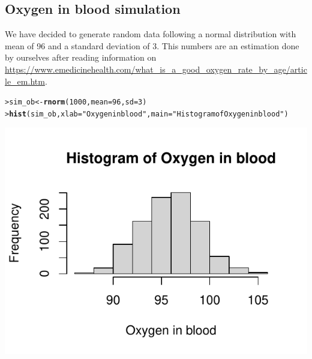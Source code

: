 \documentclass{article}\usepackage[]{graphicx}\usepackage[]{xcolor}
\makeatletter
\def\maxwidth{ %
  \ifdim\Gin@nat@width>\linewidth
    \linewidth
  \else
    \Gin@nat@width
  \fi
}
\newcommand{\hlnum}[1]{\textcolor[rgb]{0.686,0.059,0.569}{#1}}%
\newcommand{\hlstr}[1]{\textcolor[rgb]{0.192,0.494,0.8}{#1}}%
\newcommand{\hlstd}[1]{\textcolor[rgb]{0.345,0.345,0.345}{#1}}%
\newcommand{\hlkwb}[1]{\textcolor[rgb]{0.69,0.353,0.396}{#1}}%
\newcommand{\hlkwc}[1]{\textcolor[rgb]{0.333,0.667,0.333}{#1}}%
\newcommand{\hlkwd}[1]{\textcolor[rgb]{0.737,0.353,0.396}{\textbf{#1}}}%
\newenvironment{kframe}{%
 \def\at@end@of@kframe{}%
 \ifinner\ifhmode%
  \def\at@end@of@kframe{\end{minipage}}%
  \begin{minipage}{\columnwidth}%
 \fi\fi%
 \def\FrameCommand##1{\hskip\@totalleftmargin \hskip-\fboxsep
 \colorbox{shadecolor}{##1}\hskip-\fboxsep
     \hskip-\linewidth \hskip-\@totalleftmargin \hskip\columnwidth}%
 \MakeFramed {\advance\hsize-\width
   \@totalleftmargin\z@ \linewidth\hsize
   \@setminipage}}%
 {\par\unskip\endMakeFramed%
 \at@end@of@kframe}
\newenvironment{knitrout}{}{} %
\makeatother
\begin{document}
\subsection*{Oxygen in blood simulation}
We have decided to generate random data following a normal distribution with mean of 96 and a standard deviation of 3. This numbers are an estimation done by ourselves after reading information on \url{https://www.emedicinehealth.com/what_is_a_good_oxygen_rate_by_age/article_em.htm}.
\begin{knitrout}\footnotesize
{}\color{fgcolor}\begin{kframe}
\begin{alltt}
\hlstd{> }\hlstd{sim_ob} \hlkwb{<-} \hlkwd{rnorm}\hlstd{(}\hlnum{1000}\hlstd{,} \hlkwc{mean} \hlstd{=} \hlnum{96}\hlstd{,} \hlkwc{sd} \hlstd{=} \hlnum{3}\hlstd{)}
\hlstd{> }\hlkwd{hist}\hlstd{(sim_ob,} \hlkwc{xlab} \hlstd{=} \hlstr{"Oxygen in blood"}\hlstd{,} \hlkwc{main} \hlstd{=} \hlstr{"Histogram of Oxygen in blood"}\hlstd{)}
\end{alltt}
\end{kframe}

{\centering \includegraphics[width=\maxwidth]{figure/sim_ob-1} 

}


\end{knitrout}
\end{document}
